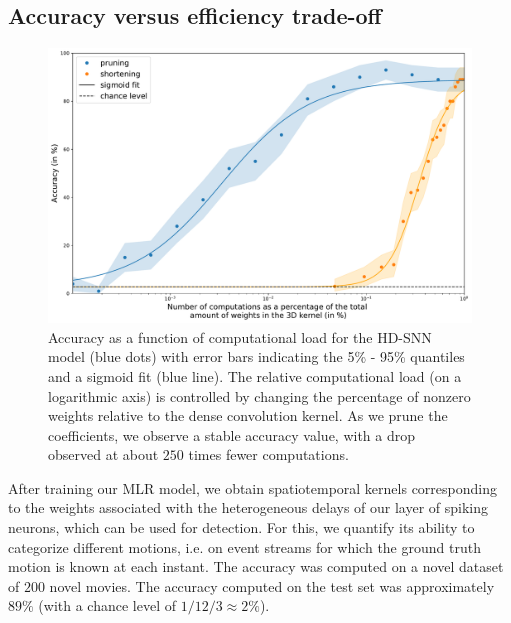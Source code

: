 \documentclass[default]{sn-jnl}%
\theoremstyle{thmstyleone}%
\theoremstyle{thmstyletwo}%
\theoremstyle{thmstylethree}%
\begin{document}
\subsection{Accuracy versus efficiency trade-off}%
%
\begin{figure}%
    \centering
    \includegraphics[width=0.95\linewidth]{figures/quant_accuracy.pdf}
    \caption{
        Accuracy as a function of computational load for the HD-SNN model (blue dots) with error bars indicating the 5\% - 95\% quantiles and a sigmoid fit (blue line). The relative computational load (on a logarithmic axis) is controlled by changing the percentage of nonzero weights relative to the dense convolution kernel. As we prune the coefficients, we observe a stable accuracy value, with a drop observed at about $250$ times fewer computations.
        }
    \label{fig:accuracy}
\end{figure}
%
After training our MLR model, we obtain spatiotemporal kernels corresponding to the weights associated with the heterogeneous delays of our layer of spiking neurons, which can be used for detection. For this, we quantify its ability to categorize different motions, i.e. on event streams for which the ground truth motion is known at each instant. The accuracy was computed on a novel dataset of $200$ novel movies. The accuracy computed on the test set was approximately $89\%$ (with a chance level of $1 / 12/ 3 \approx 2\%$). %
\end{document}
